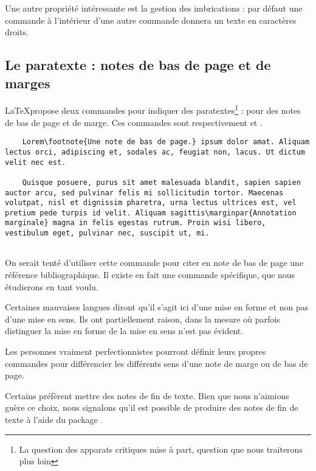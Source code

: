 Une autre propriété intéressante est la gestion des imbrications : par défaut une commande  à l'intérieur d'une autre commande  donnera un texte en caractères droits.

\subsection{Le paratexte : notes de bas de page et de marges}

\LaTeX propose deux commandes pour indiquer des paratextes\footnote{La question des apparats critiques mise à part, question que nous traiterons plus loin} : pour des notes de bas de page et de marge. Ces commandes sont respectivement  et .

\begin{verbatim}
	Lorem\footnote{Une note de bas de page.} ipsum dolor amat. Aliquam lectus orci, adipiscing et, sodales ac, feugiat non, lacus. Ut dictum velit nec est. 
	
	Quisque posuere, purus sit amet malesuada blandit, sapien sapien auctor arcu, sed pulvinar felis mi sollicitudin tortor. Maecenas volutpat, nisl et dignissim pharetra, urna lectus ultrices est, vel pretium pede turpis id velit. Aliquam sagittis\marginpar{Annotation marginale} magna in felis egestas rutrum. Proin wisi libero, vestibulum eget, pulvinar nec, suscipit ut, mi.
	
\end{verbatim}

\begin{attention}
	On serait tenté d'utiliser cette commande pour citer en note de bas de page une référence bibliographique. Il existe en fait une commande spécifique, que nous étudierons en tant voulu.
\end{attention}
\begin{attention}
	Certaines mauvaises langues diront qu'il s'agit ici d'une mise en forme et non pas d'une mise en sens. Ils ont partiellement raison, dans la mesure où parfois distinguer la mise en forme de la mise en sens n'est pas évident.
	
	Les personnes vraiment perfectionnistes pourront définir leurs propres commandes pour différencier les différents sens d'une note de marge ou de bas de page.
\end{attention}

\begin{anedocte}
	Certains préfèrent mettre des notes de fin de texte. Bien que nous n'aimions guère ce choix, nous signalons qu'il est possible de produire des notes de fin de texte à l'aide du package .
\end{anedocte}

